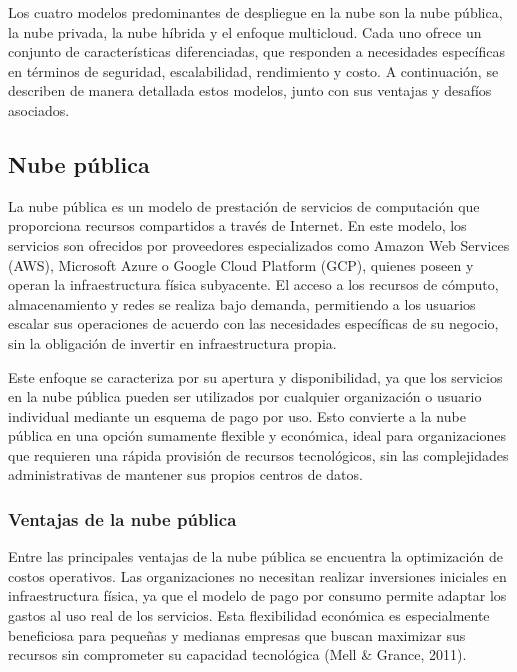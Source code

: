 {        Los cuatro modelos predominantes de despliegue en la nube son la nube p{\'u}blica, la nube privada, la nube h{\'i}brida y el enfoque multicloud. Cada uno ofrece un conjunto de caracter{\'i}sticas diferenciadas, que responden a necesidades espec{\'i}ficas en t{\'e}rminos de seguridad, escalabilidad, rendimiento y costo. A continuaci{\'o}n, se describen de manera detallada estos modelos, junto con sus ventajas y desaf{\'i}os asociados.
        
        \subsection{Nube p{\'u}blica}
            La nube p{\'u}blica es un modelo de prestaci{\'o}n de servicios de computaci{\'o}n que proporciona recursos compartidos a trav{\'e}s de Internet. En este modelo, los servicios son ofrecidos por proveedores especializados como Amazon Web Services (AWS), Microsoft Azure o Google Cloud Platform (GCP), quienes poseen y operan la infraestructura f{\'i}sica subyacente. El acceso a los recursos de c{\'o}mputo, almacenamiento y redes se realiza bajo demanda, permitiendo a los usuarios escalar sus operaciones de acuerdo con las necesidades espec{\'i}ficas de su negocio, sin la obligaci{\'o}n de invertir en infraestructura propia.
            
            Este enfoque se caracteriza por su apertura y disponibilidad, ya que los servicios en la nube p{\'u}blica pueden ser utilizados por cualquier organizaci{\'o}n o usuario individual mediante un esquema de pago por uso. Esto convierte a la nube p{\'u}blica en una opci{\'o}n sumamente flexible y econ{\'o}mica, ideal para organizaciones que requieren una r{\'a}pida provisi{\'o}n de recursos tecnol{\'o}gicos, sin las complejidades administrativas de mantener sus propios centros de datos.
            
            \subsubsection{Ventajas de la nube p{\'u}blica}
                Entre las principales ventajas de la nube p{\'u}blica se encuentra la optimizaci{\'o}n de costos operativos. Las organizaciones no necesitan realizar inversiones iniciales en infraestructura f{\'i}sica, ya que el modelo de pago por consumo permite adaptar los gastos al uso real de los servicios. Esta flexibilidad econ{\'o}mica es especialmente beneficiosa para pequeñas y medianas empresas que buscan maximizar sus recursos sin comprometer su capacidad tecnol{\'o}gica (Mell \& Grance, 2011).
                
}
